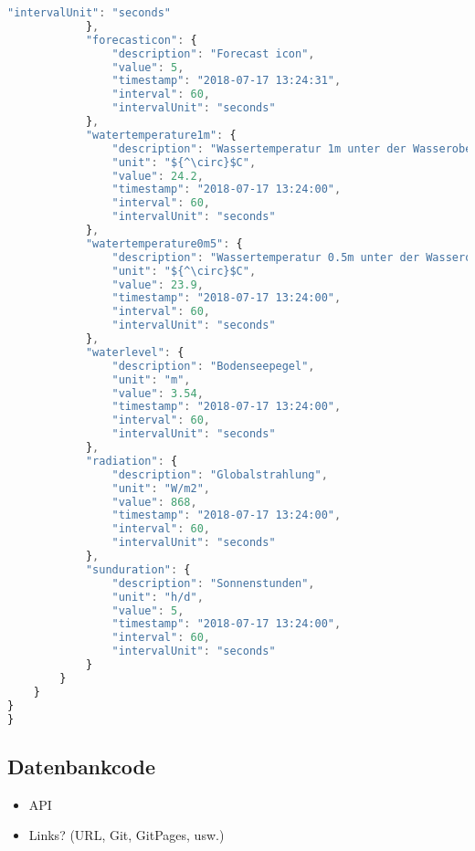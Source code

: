 \begin{lstlisting}[label=lst:JsonTree,caption=Json Struktur, language=JavaScript, style=htmlcssjs, mathescape]
                "intervalUnit": "seconds"
            },
            "forecasticon": {
                "description": "Forecast icon",
                "value": 5,
                "timestamp": "2018-07-17 13:24:31",
                "interval": 60,
                "intervalUnit": "seconds"
            },
            "watertemperature1m": {
                "description": "Wassertemperatur 1m unter der Wasseroberfläche",
                "unit": "${^\circ}$C",
                "value": 24.2,
                "timestamp": "2018-07-17 13:24:00",
                "interval": 60,
                "intervalUnit": "seconds"
            },
            "watertemperature0m5": {
                "description": "Wassertemperatur 0.5m unter der Wasseroberfläche",
                "unit": "${^\circ}$C",
                "value": 23.9,
                "timestamp": "2018-07-17 13:24:00",
                "interval": 60,
                "intervalUnit": "seconds"
            },
            "waterlevel": {
                "description": "Bodenseepegel",
                "unit": "m",
                "value": 3.54,
                "timestamp": "2018-07-17 13:24:00",
                "interval": 60,
                "intervalUnit": "seconds"
            },
            "radiation": {
                "description": "Globalstrahlung",
                "unit": "W/m2",
                "value": 868,
                "timestamp": "2018-07-17 13:24:00",
                "interval": 60,
                "intervalUnit": "seconds"
            },
            "sunduration": {
                "description": "Sonnenstunden",
                "unit": "h/d",
                "value": 5,
                "timestamp": "2018-07-17 13:24:00",
                "interval": 60,
                "intervalUnit": "seconds"
            }
        }
    }
}
}
\end{lstlisting}

\subsection{Datenbankcode}\label{anhang:Datenbankcode}
\begin{itemize}
	\item API
	\item Links? (URL, Git, GitPages, usw.)
\end{itemize}
